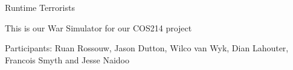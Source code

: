 Runtime Terrorists

This is our War Simulator for our COS214 project

Participants\+: Ruan Rossouw, Jason Dutton, Wilco van Wyk, Dian Lahouter, Francois Smyth and Jesse Naidoo 